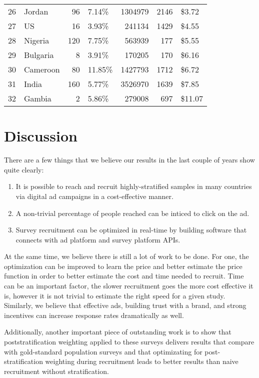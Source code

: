 \documentclass[a4paper,12pt]{article}
\theoremstyle{proposition}
\begin{document}
\begin{tabular}{llrlrrl}
26 & Jordan & 96 & 7.14\% & 1304979 & 2146 & \$3.72 \\
27 & US & 16 & 3.93\% & 241134 & 1429 & \$4.55 \\
28 & Nigeria & 120 & 7.75\% & 563939 & 177 & \$5.55 \\
29 & Bulgaria & 8 & 3.91\% & 170205 & 170 & \$6.16 \\
30 & Cameroon & 80 & 11.85\% & 1427793 & 1712 & \$6.72 \\
31 & India & 160 & 5.77\% & 3526970 & 1639 & \$7.85 \\
32 & Gambia & 2 & 5.86\% & 279008 & 697 & \$11.07 \\
\bottomrule
\end{tabular}


\section{Discussion}

There are a few things that we believe our results in the last couple of years show quite clearly:

\begin{enumerate}
\item It is possible to reach and recruit highly-stratified samples in many countries via digital ad campaigns in a cost-effective manner.
\item A non-trivial percentage of people reached can be inticed to click on the ad.
\item Survey recruitment can be optimized in real-time by building software that connects with ad platform and survey platform APIs.
\end{enumerate}

At the same time, we believe there is still a lot of work to be done. For one, the optimization can be improved to learn the price and better estimate the price function in order to better estimate the cost and time needed to recruit. Time can be an important factor, the slower recruitment goes the more cost effective it is, however it is not trivial to estimate the right speed for a given study. Similarly, we believe that effective ads, building trust with a brand, and strong incentives can increase response rates dramatically as well.

Additionally, another important piece of outstanding work is to show that poststratification weighting applied to these surveys delivers results that compare with gold-standard population surveys and that optimizating for post-stratification weighting during recruitment leads to better results than naive recruitment without stratification.


\printbibliography
\end{document}
